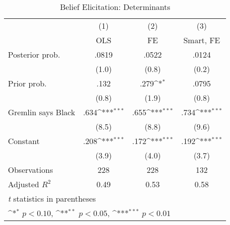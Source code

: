 \begin{table}[htbp]\centering
\def\sym#1{\ifmmode^{#1}\else\(^{#1}\)\fi}
\caption{Belief Elicitation: Determinants}
\begin{tabular}{l*{3}{c}}
\hline\hline
                &\multicolumn{1}{c}{(1)}&\multicolumn{1}{c}{(2)}&\multicolumn{1}{c}{(3)}\\
                &\multicolumn{1}{c}{OLS}&\multicolumn{1}{c}{FE}&\multicolumn{1}{c}{Smart, FE}\\
\hline
Posterior prob. &    .0819         &    .0522         &    .0124         \\
                &    (1.0)         &    (0.8)         &    (0.2)         \\
Prior prob.     &     .132         &     .279\sym{*}  &    .0795         \\
                &    (0.8)         &    (1.9)         &    (0.8)         \\
Gremlin says Black&     .634\sym{***}&     .655\sym{***}&     .734\sym{***}\\
                &    (8.5)         &    (8.8)         &    (9.6)         \\
Constant        &     .208\sym{***}&     .172\sym{***}&     .192\sym{***}\\
                &    (3.9)         &    (4.0)         &    (3.7)         \\
\hline
Observations    &      228         &      228         &      132         \\
Adjusted \(R^{2}\)&     0.49         &     0.53         &     0.58         \\
\hline\hline
\multicolumn{4}{l}{\footnotesize \textit{t} statistics in parentheses}\\
\multicolumn{4}{l}{\footnotesize \sym{*} \(p<0.10\), \sym{**} \(p<0.05\), \sym{***} \(p<0.01\)}\\
\end{tabular}
\end{table}
